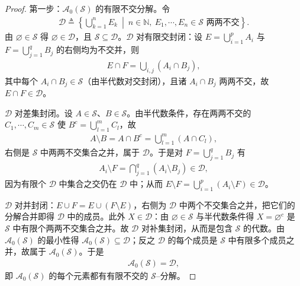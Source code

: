 \documentclass[../../main.tex]{subfiles}%
\begin{document}
\begin{proof}
第一步：$\mathcal{A}_0(\mathcal{S})$ 的有限不交分解。令
\begin{align*}
\mathcal{D}\triangleq\left\{\bigcup_{k=1}^n E_k\ \middle|\ n\in\mathbb{N},\ E_1,\cdots ,E_n\in\mathcal{S}\text{ 两两不交}\right\}.
\end{align*}
由 $\varnothing\in\mathcal{S}$ 得 $\varnothing\in\mathcal{D}$，且 $\mathcal{S}\subseteq\mathcal{D}$。$\mathcal{D}$ 对有限交封闭：设 $E=\bigcup_{i=1}^p A_i$ 与 $F=\bigcup_{j=1}^q B_j$ 的右侧均为不交并，则
\begin{align*}
E\cap F=\bigcup_{i,j}(A_i\cap B_j),
\end{align*}
其中每个 $A_i\cap B_j\in\mathcal{S}$（由半代数对交封闭），且诸 $A_i\cap B_j$ 两两不交，故 $E\cap F\in\mathcal{D}$。

$\mathcal{D}$ 对差集封闭。设 $A\in\mathcal{S}$、$B\in\mathcal{S}$。由半代数条件，存在两两不交的 $C_1,\cdots ,C_m\in\mathcal{S}$ 使 $B^c=\bigcup_{l=1}^m C_l$，故
\begin{align*}
A\setminus B=A\cap B^c=\bigcup_{l=1}^m(A\cap C_l),
\end{align*}
右侧是 $\mathcal{S}$ 中两两不交集合之并，属于 $\mathcal{D}$。于是对 $F=\bigcup_{j=1}^q B_j$ 有
\begin{align*}
A_i\setminus F=\bigcap_{j=1}^q(A_i\setminus B_j)\in\mathcal{D},
\end{align*}
因为有限个 $\mathcal{D}$ 中集合之交仍在 $\mathcal{D}$ 中；从而 $E\setminus F=\bigcup_{i=1}^p(A_i\setminus F)\in\mathcal{D}$。

$\mathcal{D}$ 对并封闭：$E\cup F=E\cup(F\setminus E)$，右侧为 $\mathcal{D}$ 中两个不交集合之并，把它们的分解合并即得 $\mathcal{D}$ 中的成员。此外 $X\in\mathcal{D}$：由 $\varnothing\in\mathcal{S}$ 与半代数条件得 $X=\varnothing^c$ 是 $\mathcal{S}$ 中有限个两两不交集合之并。故 $\mathcal{D}$ 对补集封闭，从而是包含 $\mathcal{S}$ 的代数。由 $\mathcal{A}_0(\mathcal{S})$ 的最小性得 $\mathcal{A}_0(\mathcal{S})\subseteq\mathcal{D}$；反之 $\mathcal{D}$ 的每个成员是 $\mathcal{S}$ 中有限多个成员之并，故属于 $\mathcal{A}_0(\mathcal{S})$。于是
\begin{align*}
\mathcal{A}_0(\mathcal{S})=\mathcal{D},
\end{align*}
即 $\mathcal{A}_0(\mathcal{S})$ 的每个元素都有有限不交的 $\mathcal{S}$--分解。


\end{proof}
\end{document}
